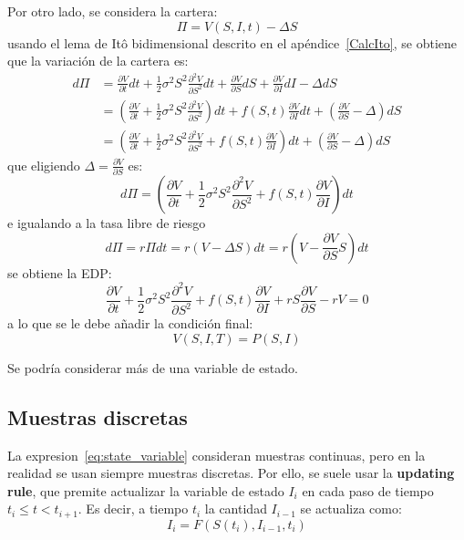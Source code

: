 Por otro lado, se considera la cartera:
\begin{equation*}
    \Pi = V(S,I,t) - \Delta S
\end{equation*}
usando el lema de Itô bidimensional descrito en el apéndice~\ref{CalcIto}, se obtiene que la variación de la cartera es:
\begin{align*}
    d\Pi &= \frac{\partial V}{\partial t} dt + \frac{1}{2} \sigma^2 S^2 \frac{\partial^2 V}{\partial S^2} dt + \frac{\partial V}{\partial S} dS + \frac{\partial V}{\partial I} dI - \Delta dS \\
    &= \left( \frac{\partial V}{\partial t}  +  \frac{1}{2} \sigma^2 S^2 \frac{\partial^2 V}{\partial S^2} \right) dt +  f(S, t) \frac{\partial V}{\partial I} dt + \left( \frac{\partial V}{\partial S} - \Delta \right) dS \\
    &= \left( \frac{\partial V}{\partial t}  +  \frac{1}{2} \sigma^2 S^2 \frac{\partial^2 V}{\partial S^2} + f(S, t) \frac{\partial V}{\partial I} \right) dt +  \left( \frac{\partial V}{\partial S} - \Delta \right) dS
\end{align*}
que eligiendo $\Delta = \frac{\partial V}{\partial S}$ es:
\begin{equation*}
    d\Pi = \left( \frac{\partial V}{\partial t}  +  \frac{1}{2} \sigma^2 S^2 \frac{\partial^2 V}{\partial S^2} + f(S, t) \frac{\partial V}{\partial I} \right) dt
\end{equation*}
e igualando a la tasa libre de riesgo
\[
    d\Pi = r\Pi dt = r(V - \Delta S) dt  = r\left( V - \frac{\partial V}{\partial S} S \right) dt
\]
se obtiene la EDP\@:
\begin{equation}\label{eq:strong_path}
    \boxed{\frac{\partial V}{\partial t}  +  \frac{1}{2} \sigma^2 S^2 \frac{\partial^2 V}{\partial S^2} + f(S, t) \frac{\partial V}{\partial I} + r S \frac{\partial V}{\partial S} - rV = 0}
\end{equation}
a lo que se le debe añadir la condición final:
\[
    \boxed{V(S, I, T) = P(S, I)}
\]

Se podría considerar más de una variable de estado.


\subsection{Muestras discretas}
La expresion~\eqref{eq:state_variable} consideran muestras continuas, pero en la realidad se usan siempre muestras discretas. Por ello, se suele usar la \textbf{updating rule}, que premite actualizar la variable de estado $I_i$ en cada paso de tiempo $t_i \leq t < t_{i+1}$. Es decir, a tiempo $t_i$ la cantidad $I_{i-1}$ se actualiza como:
\begin{equation}\label{eq:updating_rule}
    I_i = F(S(t_i), I_{i-1}, t_i)
\end{equation}

